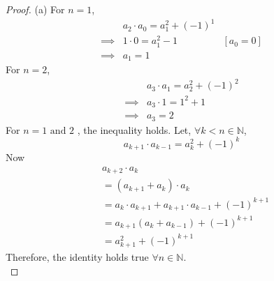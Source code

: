 \documentclass[12pt]{article}
\begin{document}
\begin{proof}
(a) For $n = 1$,
\begin{align*}
& a_2\cdot a_0 = a_1^2 + (-1)^1 \\
\implies & 1\cdot 0 = a_1^2 - 1 & [a_0 = 0] \\
\implies & a_1 = 1
\end{align*}
For $n = 2$,
\begin{align*}
& a_3\cdot a_1 = a_2^2 + (-1)^2 \\
\implies & a_3 \cdot 1 = 1^2 + 1 \\
\implies & a_3 = 2
\end{align*}
For $n = 1 \text{ and } 2$ , the inequality holds. Let, $\forall k < n \in \mathbb{N}$,
\[
a_{k+1}\cdot a_{k-1} = a_k^2 + (-1)^k
\]
Now
\begin{align*}
& a_{k+2}\cdot a_k \\
& = (a_{k+1} + a_k) \cdot a_k \\
& = a_k \cdot a_{k+1} + a_{k+1}\cdot a_{k-1} + (-1)^{k+1} \\
& = a_{k+1}(a_k + a_{k-1}) + (-1)^{k+1} \\
& = a_{k+1}^2 + (-1)^{k+1}
\end{align*}
Therefore, the identity holds true $\forall n \in \mathbb{N}$.\\


\end{proof}
\end{document}
